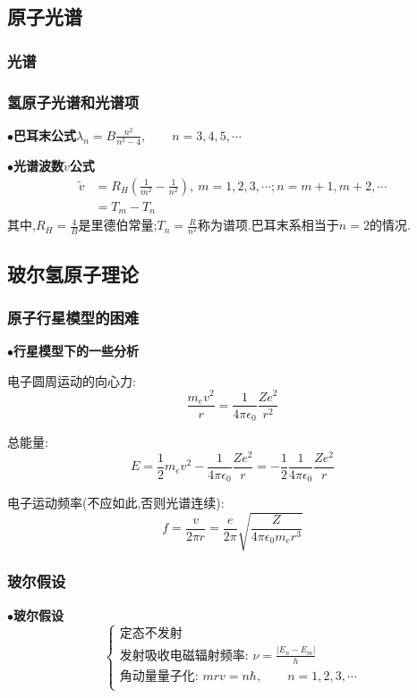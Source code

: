 \documentclass[UTF8]{article}
\newcommand{\keypoint}[2]{$\bullet$\textbf{#1}\quad#2\par}
\begin{document}
\subsection{原子光谱}
\subsubsection{光谱}
\subsubsection{氢原子光谱和光谱项}
\keypoint{巴耳末公式}{$\lambda_n=B\frac{n^2}{n^2-4},\qquad n=3,4,5,\cdots$}
\keypoint{光谱波数$\tilde{v}$公式}{
	\begin{align*}
	\tilde{v}&=R_H\left(\frac{1}{m^2}-\frac{1}{n^2}\right),\ m=1,2,3,\cdots;n=m+1,m+2,\cdots\\
	&=T_m-T_n
	\end{align*}
	其中,$R_H=\frac{4}{B}$是里德伯常量;$T_n=\frac{R}{n^2}$称为谱项.巴耳末系相当于$n=2$的情况.\par
}
\subsection{玻尔氢原子理论}
\subsubsection{原子行星模型的困难}
\keypoint{行星模型下的一些分析}{
	\par
	电子圆周运动的向心力:
	$$\frac{m_ev^2}{r}=\frac{1}{4\pi\epsilon_0}\frac{Ze^2}{r^2}$$\par
	总能量:
	$$E=\frac{1}{2}m_ev^2-\frac{1}{4\pi\epsilon_0}\frac{Ze^2}{r}=-\frac{1}{2}\frac{1}{4\pi\epsilon_0}\frac{Ze^2}{r}$$\par
	电子运动频率(不应如此,否则光谱连续):
	$$f=\frac{v}{2\pi r}=\frac{e}{2\pi}\sqrt{\frac{Z}{4\pi\epsilon_0m_er^3}}$$\par
	
}
\subsubsection{玻尔假设}
\keypoint{玻尔假设}{
	$$
	\left\{
	\begin{array}{l}
	\mbox{定态不发射}\\
	\mbox{发射吸收电磁辐射频率: }\nu=\frac{|E_n-E_m|}{h}\\
	\mbox{角动量量子化: }mrv=n\hbar,\qquad n=1,2,3,\cdots\\
	\end{array}
	\right.
	$$
}
\end{document}
